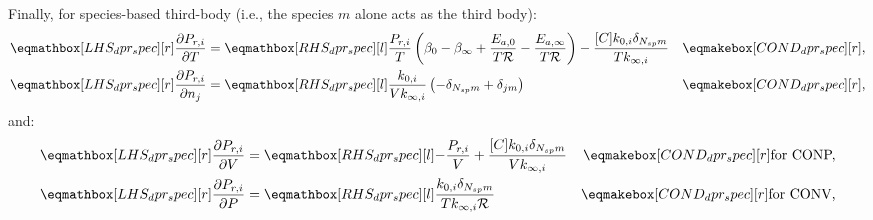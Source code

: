 \documentclass[12pt]{article}
\newcommand{\ns}{N_{sp}}
\newcommand{\conp}{CONP}
\newcommand{\conv}{CONV}
\newcommand{\dconp}{\ifmmode\text{for \conp,}\else for \conp,\fi}
\newcommand{\dconv}{\ifmmode\text{for \conv,}\else for \conv,\fi}
\newcommand{\Ru}{\mathcal{R}}
\begin{document}
Finally, for species-based third-body (i.e., the species $m$ alone acts as the third body):
\begin{align}
 \lhs{dpr_spec}{\frac{\partial P_{r, i} }{\partial T }} &=\rhs{dpr_spec}{\frac{P_{r, i}}{T} \left(\beta_{0} - \beta_{\infty} + \frac{E_{a, 0}}{T \Ru} - \frac{E_{a, \infty}}{T \Ru}\right) - \frac{[C] k_{0, i} \delta_{\ns m}}{T k_{\infty, i}}} & \cond{dpr_spec}{,} \label{e:dpr_spec_dt} \\
 \lhs{dpr_spec}{\frac{\partial P_{r, i} }{\partial n_j }} &=\rhs{dpr_spec}{\frac{k_{0, i}}{V k_{\infty, i}} \left(- \delta_{\ns m} + \delta_{j m}\right)} & \cond{dpr_spec}{,} \label{e:dpr_spec_dnj}
\end{align}
and:
\begin{subequations}
 \label{e:dpr_spec_de}
 \begin{align}
  \lhs{dpr_spec}{\frac{\partial P_{r, i} }{\partial V }} &= \rhs{dpr_spec}{- \frac{P_{r, i}}{V} + \frac{[C] k_{0, i} \delta_{\ns m}}{V k_{\infty, i}}} & \cond{dpr_spec}{\dconp}\\
  \lhs{dpr_spec}{\frac{\partial P_{r, i} }{\partial P }} &= \rhs{dpr_spec}{\frac{k_{0, i} \delta_{\ns m}}{T k_{\infty, i} \Ru}} & \cond{dpr_spec}{\dconv}
 \end{align}
\end{subequations}
\end{document}
